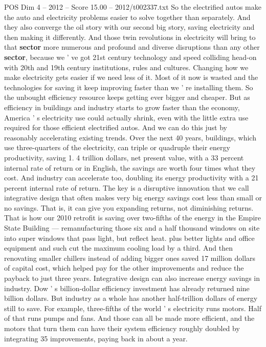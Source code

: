\begin{textsample}{POS Dim 4 – 2012 – Score 15.00 – 2012/t002337.txt}
So the electrified autos make the auto and electricity problems easier to solve together than separately.
And they also converge the oil story with our second big story, saving electricity and then making it differently.
And those twin revolutions in electricity will bring to that \textbf{sector} more numerous and profound and diverse disruptions than any other \textbf{sector}, because we ' ve got 21st century technology and speed colliding head-on with 20th and 19th century institutions, rules and cultures.
Changing how we make electricity gets easier if we need less of it.
Most of it now is wasted and the technologies for saving it keep improving faster than we ' re installing them.
So the unbought efficiency resource keeps getting ever bigger and cheaper.
But as efficiency in buildings and industry starts to grow faster than the economy, America ' s electricity use could actually shrink, even with the little extra use required for those efficient electrified autos.
And we can do this just by reasonably accelerating existing trends.
Over the next 40 years, buildings, which use three-quarters of the electricity, can triple or quadruple their energy productivity, saving 1. 4 trillion dollars, net present value, with a 33 percent internal rate of return or in English, the savings are worth four times what they cost.
And industry can accelerate too, doubling its energy productivity with a 21 percent internal rate of return.
The key is a disruptive innovation that we call integrative design that often makes very big energy savings cost less than small or no savings.
That is, it can give you expanding returns, not diminishing returns.
That is how our 2010 retrofit is saving over two-fifths of the energy in the Empire State Building — remanufacturing those six and a half thousand windows on site into super windows that pass light, but reflect heat. plus better lights and office equipment and such cut the maximum cooling load by a third.
And then renovating smaller chillers instead of adding bigger ones saved 17 million dollars of capital cost, which helped pay for the other improvements and reduce the payback to just three years.
Integrative design can also increase energy savings in industry.
Dow ' s billion-dollar efficiency investment has already returned nine billion dollars.
But industry as a whole has another half-trillion dollars of energy still to save.
For example, three-fifths of the world ' s electricity runs motors.
Half of that runs pumps and fans.
And those can all be made more efficient, and the motors that turn them can have their system efficiency roughly doubled by integrating 35 improvements, paying back in about a year.

\end{textsample}
